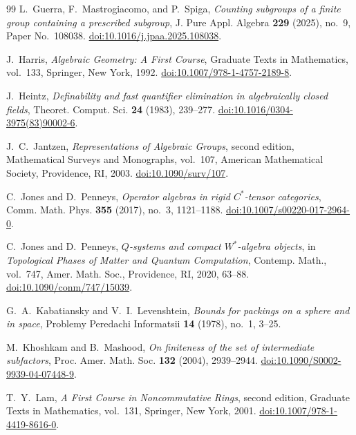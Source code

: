 \documentclass[11pt]{amsart}
\theoremstyle{definition}
\theoremstyle{remark}
\begin{document}
\begin{thebibliography}{99}
L.~Guerra, F.~Mastrogiacomo, and P.~Spiga,
\emph{Counting subgroups of a finite group containing a prescribed subgroup},
J. Pure Appl. Algebra \textbf{229} (2025), no.~9, Paper No.~108038.
\href{https://doi.org/10.1016/j.jpaa.2025.108038}
{doi:10.1016/j.jpaa.2025.108038}.

J.~Harris,
\emph{Algebraic Geometry: A First Course},
Graduate Texts in Mathematics, vol.~133, Springer, New York, 1992.
\href{https://doi.org/10.1007/978-1-4757-2189-8}
{doi:10.1007/978-1-4757-2189-8}.

J.~Heintz,
\emph{Definability and fast quantifier elimination in algebraically closed
fields},
Theoret. Comput. Sci. \textbf{24} (1983), 239--277.
\href{https://doi.org/10.1016/0304-3975(83)90002-6}
{doi:10.1016/0304-3975(83)90002-6}.

J.~C.~Jantzen,
\emph{Representations of Algebraic Groups}, second edition,
Mathematical Surveys and Monographs, vol.~107,
American Mathematical Society, Providence, RI, 2003.
\href{https://doi.org/10.1090/surv/107}{doi:10.1090/surv/107}.

C.~Jones and D.~Penneys,
\emph{Operator algebras in rigid $C^*$-tensor categories},
Comm. Math. Phys. \textbf{355} (2017), no.~3, 1121--1188.
\href{https://doi.org/10.1007/s00220-017-2964-0}
{doi:10.1007/s00220-017-2964-0}.

C.~Jones and D.~Penneys,
\emph{$Q$-systems and compact $W^*$-algebra objects},
in \emph{Topological Phases of Matter and Quantum Computation},
Contemp. Math., vol.~747, Amer. Math. Soc., Providence, RI, 2020, 63--88.
\href{https://doi.org/10.1090/conm/747/15039}
{doi:10.1090/conm/747/15039}.

G.~A.~Kabatiansky and V.~I.~Levenshtein,
\emph{Bounds for packings on a sphere and in space},
Problemy Peredachi Informatsii \textbf{14} (1978), no.~1, 3--25.

M.~Khoshkam and B.~Mashood,
\emph{On finiteness of the set of intermediate subfactors},
Proc. Amer. Math. Soc. \textbf{132} (2004), 2939--2944.
\href{https://doi.org/10.1090/S0002-9939-04-07448-9}
{doi:10.1090/S0002-9939-04-07448-9}.

T.~Y.~Lam,
\emph{A First Course in Noncommutative Rings}, second edition,
Graduate Texts in Mathematics, vol.~131, Springer, New York, 2001.
\href{https://doi.org/10.1007/978-1-4419-8616-0}
{doi:10.1007/978-1-4419-8616-0}.


\end{thebibliography}
\end{document}
